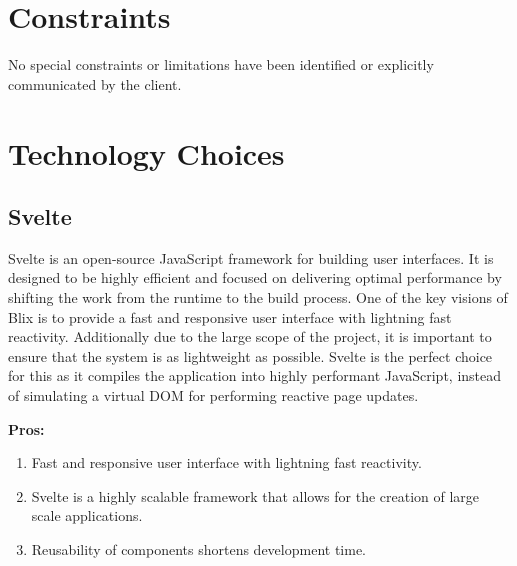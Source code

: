 \documentclass[11pt,a4paper]{article}
\begin{document}


\section{Constraints}

No special constraints or limitations have been identified or explicitly
communicated by the client.

\section{Technology Choices}

\subsection{Svelte}
Svelte is an open-source JavaScript framework for building user interfaces. It
is designed to be highly efficient and focused on delivering optimal performance
by shifting the work from the runtime to the build process. One of the key
visions of Blix is to provide a fast and responsive user interface with
lightning fast reactivity. Additionally due to the large scope of the project,
it is important to ensure that the system is as lightweight as possible. Svelte
is the perfect choice for this as it compiles the application into highly
performant JavaScript, instead of simulating a virtual DOM for performing
reactive page updates.

\textbf{Pros:}
\begin{enumerate}[label*=\arabic*.]
	\item[\textbullet] Fast and responsive user interface with lightning fast
	reactivity. 
	\item[\textbullet] Svelte is a highly scalable framework that allows for the
	creation of large scale applications.
	\item[\textbullet] Reusability of components shortens development time.
\end{enumerate}
\end{document}
